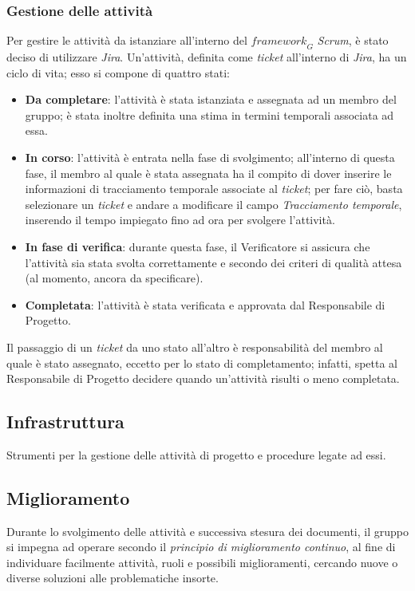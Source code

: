 \subsubsection{Gestione delle attività}
Per gestire le attività da istanziare all'interno del $\textit{framework}_G$ \textit{Scrum}, è stato deciso di utilizzare \textit{Jira}. Un'attività, definita come \textit{ticket} all'interno di \textit{Jira}, ha un ciclo di vita; esso si compone di quattro stati:

\begin{itemize}
    \item \textbf{Da completare}: l'attività è stata istanziata e assegnata ad un membro del gruppo; è stata inoltre definita una stima in termini temporali associata ad essa.
    \item \textbf{In corso}: l'attività è entrata nella fase di svolgimento; all'interno di questa fase, il membro al quale è stata assegnata ha il compito di dover inserire le informazioni di tracciamento temporale associate al \textit{ticket}; per fare ciò, basta selezionare un \textit{ticket} e andare a modificare il campo \textit{Tracciamento temporale}, inserendo il tempo impiegato fino ad ora per svolgere l'attività.
    \item \textbf{In fase di verifica}: durante questa fase, il Verificatore si assicura che l'attività sia stata svolta correttamente e secondo dei criteri di qualità attesa (al momento, ancora da specificare).
    \item \textbf{Completata}: l'attività è stata verificata e approvata dal Responsabile di Progetto.
\end{itemize}
Il passaggio di un \textit{ticket} da uno stato all'altro è responsabilità del membro al quale è stato assegnato, eccetto per lo stato di completamento; infatti, spetta al Responsabile di Progetto decidere quando un'attività risulti o meno completata.

\subsection{Infrastruttura}
Strumenti per la gestione delle attività di progetto e procedure legate ad essi.
\subsection{Miglioramento}
Durante lo svolgimento delle attività e successiva stesura dei documenti, il gruppo si impegna ad operare secondo il \textit{principio di miglioramento continuo}, al fine di individuare facilmente attività, ruoli e possibili miglioramenti, cercando nuove o diverse soluzioni alle problematiche insorte.
